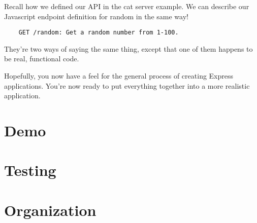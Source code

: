 \begin{kaobox}[title=Describing the API with English]
    Recall how we defined our API in the cat server example. We can describe our Javascript endpoint definition for random in the same way! 

    \begin{verbatim}
    GET /random: Get a random number from 1-100.
    \end{verbatim}
    
    They're two ways of saying the same thing, except that one of them happens to be real, functional code.
\end{kaobox}

Hopefully, you now have a feel for the general process of creating Express applications. You're now ready to put everything together into a more realistic application.

\section{Demo}

\section{Testing}

\section{Organization}
